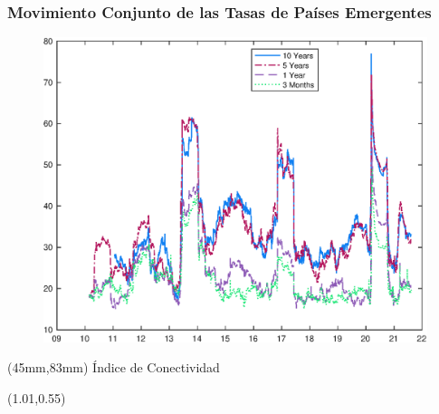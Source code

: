 \documentclass[12pt, aspectratio=169, xcolor=dvipsnames]{beamer}
\begin{document}
\begin{frame}[label=DYindex]
\frametitle{Movimiento Conjunto de las Tasas de Países Emergentes}
\begin{figure}[!htbp]
	\begin{center} %
		\includegraphics[trim={0cm 0cm 0cm 0cm},clip,height=0.8\textheight,width=0.85\linewidth]{../Figures/Estimation/dy_index_dn_data.eps}
		\par\end{center}
\end{figure}
\begin{textblock*}{10cm}(45mm,83mm)
	\footnotesize Índice de Conectividad \citep{DieboldYilmaz:2014}
\end{textblock*}
\begin{textblock*}{5cm}(1.01\textwidth,0.55\textheight)
	\hyperlink{RollingCorr}{}
\end{textblock*}
\end{frame}

\end{document}
